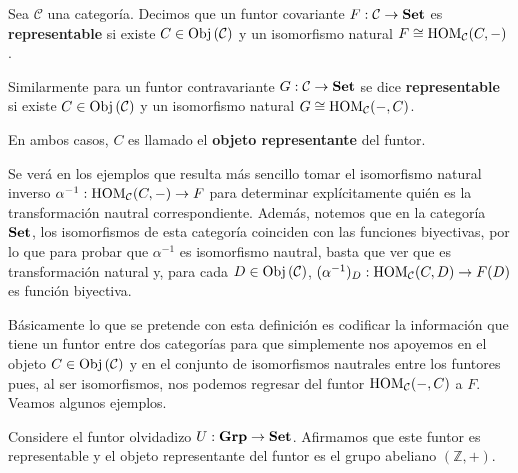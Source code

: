 \documentclass[12pt]{report}
\newcounter{it}
\theoremstyle{largebreak}
\newcommand\cf[3]{\ensuremath{#1:#2\rightarrow#3}}
\newcommand{\Obj}[1]{\ensuremath{\textup{Obj}\left(#1\right)}}
\newcommand{\Cat}[1]{\ensuremath{\textup{\textbf{#1}}}}
\begin{document}
    \begin{mydef}
        Sea $\mathcal{C}$ una categoría. Decimos que un funtor covariante $\cf{F}{\mathcal{C}}{\Cat{Set}}$ es \textbf{representable} si existe $C\in\Obj{\mathcal{C}}$ y un isomorfismo natural $F\cong\textup{HOM}_{\mathcal{C}}(C,-)$. 
        
        Similarmente para un funtor contravariante $\cf{G}{\mathcal{C}}{\Cat{Set}}$ se dice \textbf{representable} si existe $C\in\Obj{\mathcal{C}}$ y un isomorfismo natural $G\cong\textup{HOM}_{\mathcal{C}}(-,C)$.
        
        En ambos casos, $C$ es llamado el \textbf{objeto representante} del funtor.
    \end{mydef}

    \begin{obs}
        Se verá en los ejemplos que resulta más sencillo tomar el isomorfismo natural inverso $\cf{\alpha^{-1}}{\HOM{\mathcal{C}}(C,-)}{F}$ para determinar explícitamente quién es la transformación nautral correspondiente. Además, notemos que en la categoría $\Cat{Set}$, los isomorfismos de esta categoría coinciden con las funciones biyectivas, por lo que para probar que $\alpha^{-1}$ es isomorfismo nautral, basta que ver que es transformación natural y, para cada $D\in\Obj{\mathcal{C}}$, $\cf{(\alpha^{-1})_D}{\HOM{\mathcal{C}}(C,D)}{F(D)}$ es función biyectiva.
    \end{obs}

    Básicamente lo que se pretende con esta definición es codificar la información que tiene un funtor entre dos categorías para que simplemente nos apoyemos en el objeto $C\in\Obj{\mathcal{C}}$ y en el conjunto de isomorfismos nautrales entre los funtores pues, al ser isomorfismos, nos podemos regresar del funtor $\textup{HOM}_{\mathcal{C}}(-,C)$ a $F$. Veamos algunos ejemplos.

    \begin{exa}
        Considere el funtor olvidadizo $\cf{U}{\Cat{Grp}}{\Cat{Set}}$. Afirmamos que este funtor es representable y el objeto representante del funtor es el grupo abeliano $(\mathbb{Z},+)$.
    \end{exa}
\end{document}
